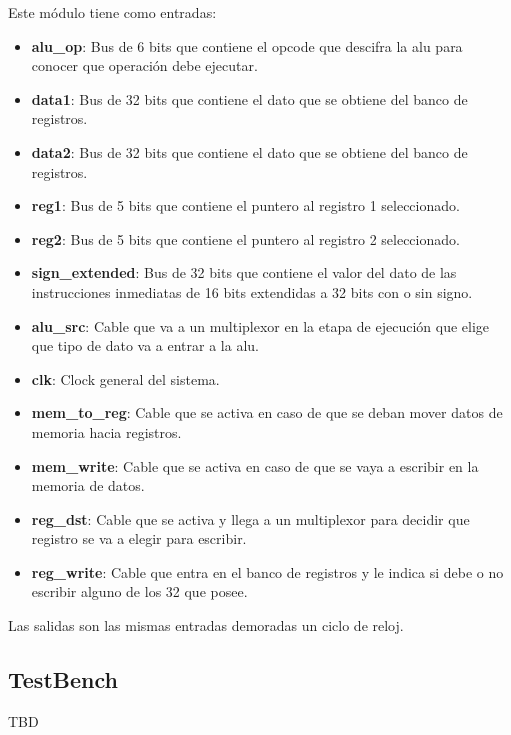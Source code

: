 Este m\'odulo tiene como entradas:
\begin{itemize}
  \item \textbf{alu\_op}: Bus de 6 bits que contiene el opcode que descifra la alu para conocer que operaci\'on debe ejecutar.
  \item \textbf{data1}: Bus de 32 bits que contiene el dato que se obtiene del banco de registros.
  \item \textbf{data2}: Bus de 32 bits que contiene el dato que se obtiene del banco de registros.
  \item \textbf{reg1}: Bus de 5 bits que contiene el puntero al registro 1 seleccionado.
  \item \textbf{reg2}: Bus de 5 bits que contiene el puntero al registro 2 seleccionado.
  \item \textbf{sign\_extended}: Bus de 32 bits que contiene el valor del dato de las instrucciones inmediatas de 16 bits extendidas a 32 bits con o sin signo.
  \item \textbf{alu\_src}: Cable que va a un multiplexor en la etapa de ejecuci\'on que elige que tipo de dato va a entrar a la alu. 
  \item \textbf{clk}: Clock general del sistema.
  \item \textbf{mem\_to\_reg}: Cable que se activa en caso de que se deban mover datos de memoria hacia registros.
  \item \textbf{mem\_write}: Cable que se activa en caso de que se vaya a escribir en la memoria de datos.
  \item \textbf{reg\_dst}: Cable que se activa y llega a un multiplexor para decidir que registro se va a elegir para escribir.
  \item \textbf{reg\_write}: Cable que entra en el banco de registros y le indica si debe o no escribir alguno de los 32 que posee.
\end{itemize}

Las salidas son las mismas entradas demoradas un ciclo de reloj.

\subsection{TestBench}
TBD